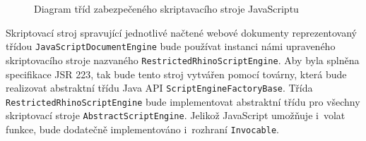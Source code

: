 \begin{figure}[H]
  \begin{center}
    \caption{Diagram tříd zabezpečeného skriptavacího stroje JavaScriptu}
    \label{Figure.JavaScriptEngineJSR223Design}
  \end{center}
\end{figure}

Skriptovací stroj spravující jednotlivé načtené webové dokumenty reprezentovaný třídou \texttt{JavaScriptDocumentEngine} bude používat instanci námi upraveného skriptovacího stroje nazvaného \texttt{RestrictedRhinoScriptEngine}. Aby byla splněna specifikace JSR 223, tak bude tento stroj vytvářen pomocí továrny, která bude realizovat abstraktní třídu Java API \texttt{ScriptEngineFactoryBase}. Třída \texttt{RestrictedRhinoScriptEngine} bude implementovat abstraktní třídu pro všechny skriptovací stroje \texttt{AbstractScriptEngine}. Jelikož JavaScript umožňuje i~volat funkce, bude dodatečně implementováno i~rozhraní \texttt{Invocable}. 


